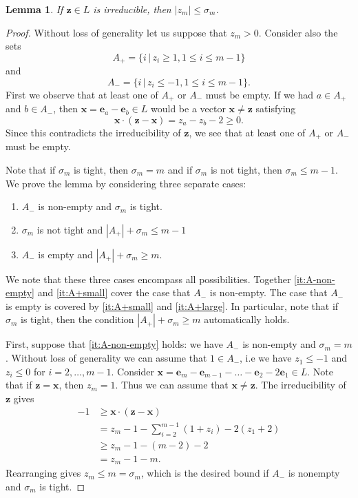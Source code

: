 \documentclass[10pt,a4paper]{amsart}
\newtheorem{lem}{Lemma}
\newcommand{\e}{\bm{e}}
\begin{document}
\begin{lem}\label{lem:sigma_m_bound}
If $\bm{z}\in L$ is irreducible, then $|z_m|\leq \sigma_m$.
\end{lem}

\begin{proof}
Without loss of generality let us suppose that $z_m>0$. Consider also the sets
\[
A_+=\{i\,|\, z_i\geq 1, 1\leq i \leq m-1\}
\]
and
\[
A_-=\{i\,|\, z_i\leq -1, 1\leq i \leq m-1\}.
\]
First we observe that at least one of $A_+$ or $A_-$ must be empty. If we had $a\in A_+$ and $b\in A_-$, then $\bm{x}=\e_a-\e_b\in L$ would be a vector $\bm{x}\neq \bm{z}$ satisfying 
\[
\bm{x}\cdot (\bm{z}-\bm{x})=z_a-z_b-2\geq 0.
\]
Since this contradicts the irreducibility of $\bm{z}$, we see that at least one of $A_+$ or $A_-$ must be empty.

Note that if $\sigma_m$ is tight, then $\sigma_m=m$ and if $\sigma_m$ is not tight, then $\sigma_m\leq m-1$. We prove the lemma by considering three separate cases:
\begin{enumerate}%
    \item\label{it:A-non-empty} $A_-$ is non-empty and $\sigma_m$ is tight.
    \item\label{it:A+small} $\sigma_m$ is not tight and $|A_+|+\sigma_m\leq m-1$
    \item\label{it:A+large} $A_-$ is empty and $|A_+|+\sigma_m\geq m$.
\end{enumerate}
We note that these three cases encompass all possibilities. Together \eqref{it:A-non-empty} and \eqref{it:A+small} cover the case that $A_-$ is non-empty. The case that $A_-$ is empty is covered by \eqref{it:A+small} and \eqref{it:A+large}. In particular, note that if $\sigma_m$ is tight, then the condition $|A_+|+\sigma_m\geq m$ automatically holds. 

First, suppose that \eqref{it:A-non-empty} holds: we have $A_-$ is non-empty and $\sigma_m=m$. Without loss of generality we can assume that $1\in A_-$, i.e we have $z_1\leq -1$ and $z_i\leq 0$ for $i=2,\dots, m-1$. Consider $\bm{x}=\e_m-\e_{m-1}-\dots - \e_2 -2\e_1\in L$. Note that if $\bm{z}=\bm{x}$, then $z_m=1$. Thus we can assume that $\bm{x}\neq \bm{z}$.
The irreducibility of $\bm{z}$ gives 
\begin{align*}
    -1&\geq \bm{x}\cdot (\bm{z}-\bm{x}) \\
    &= z_m-1 - \sum_{i=2}^{m-1} (1+z_i) -2(z_1+2)\\
    & \geq z_m -1 -(m-2) -2\\
    &= z_m -1 -m.
\end{align*}
Rearranging gives $z_m\leq m=\sigma_m$, which is the desired bound if $A_-$ is nonempty and $\sigma_m$ is tight.


\end{proof}
\end{document}
